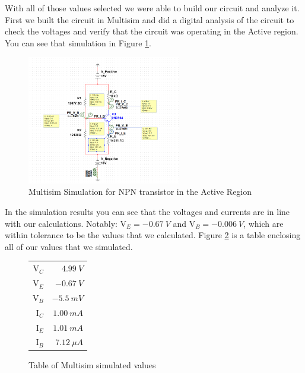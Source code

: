 \documentclass{article}
\begin{document}
With all of those values selected we were able to build
our circuit and analyze it. First we built the circuit in
Multisim and did a digital analysis of the circuit to
check the voltages and verify that the circuit was 
operating in the Active region. You can see that simulation
in Figure \ref{fig:multisimPart1}.

\begin{figure}[h!]
  \begin{center}
  \includegraphics[width=0.6\textwidth]{Multisim Simulation Image.png}
  \caption{Multisim Simulation for NPN transistor
  in the Active Region}
  \label{fig:multisimPart1}
  \end{center}
\end{figure}

In the simulation results you can see that the voltages
and currents are in line with our calculations.
Notably: V$_E=\SI{-0.67}{V}$ and V$_B=\SI{-0.006}{V}$,
which are within tolerance to be the values that
we calculated. Figure \ref{table:activeTableSim} is
a table enclosing all of our values that we simulated.

\begin{figure}
  \begin{center}
    \begin{tabular}{r|r}
      V$_C$ & $\SI{4.99}{V}$ \\
      V$_E$ & $\SI{-0.67}{V}$ \\
      V$_B$ & $\SI{-5.5}{mV}$ \\
      I$_C$ & $\SI{1.00}{mA}$ \\
      I$_E$ & $\SI{1.01}{mA}$ \\
      I$_B$ & $\SI{7.12}{\mu A}$ \\

    \end{tabular}
  \end{center}
  \caption{Table of Multisim simulated values}
  \label{table:activeTableSim}
\end{figure}
\end{document}
